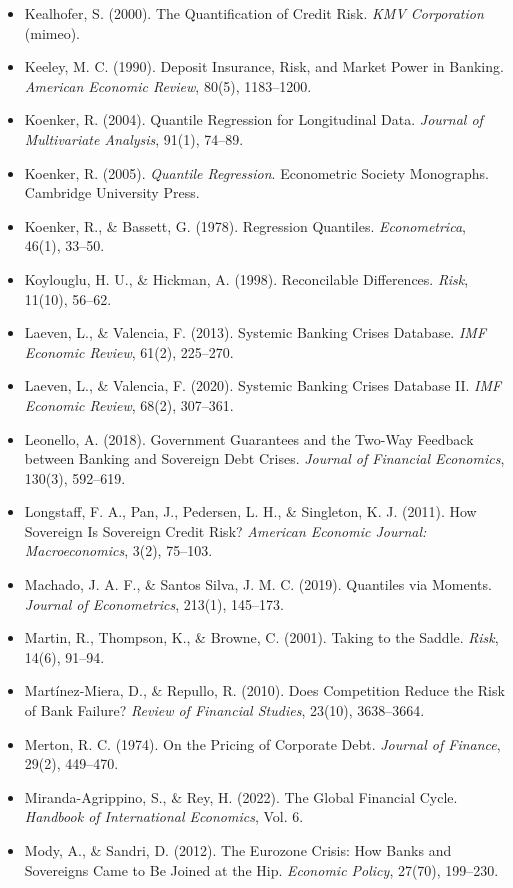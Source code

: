 \documentclass[5p,times,twocolumn,authoryear]{elsarticle}
\begin{document}
\begin{itemize}
    \item Kealhofer, S. (2000). The Quantification of Credit Risk. \textit{KMV Corporation} (mimeo).
    \item Keeley, M. C. (1990). Deposit Insurance, Risk, and Market Power in Banking. \textit{American Economic Review}, 80(5), 1183–1200.
    \item Koenker, R. (2004). Quantile Regression for Longitudinal Data. \textit{Journal of Multivariate Analysis}, 91(1), 74–89.
    \item Koenker, R. (2005). \textit{Quantile Regression}. Econometric Society Monographs. Cambridge University Press.
    \item Koenker, R., \& Bassett, G. (1978). Regression Quantiles. \textit{Econometrica}, 46(1), 33–50.
    \item Koylouglu, H. U., \& Hickman, A. (1998). Reconcilable Differences. \textit{Risk}, 11(10), 56–62.
    \item Laeven, L., \& Valencia, F. (2013). Systemic Banking Crises Database. \textit{IMF Economic Review}, 61(2), 225–270.
    \item Laeven, L., \& Valencia, F. (2020). Systemic Banking Crises Database II. \textit{IMF Economic Review}, 68(2), 307–361.
    \item Leonello, A. (2018). Government Guarantees and the Two-Way Feedback between Banking and Sovereign Debt Crises. \textit{Journal of Financial Economics}, 130(3), 592–619.
    \item Longstaff, F. A., Pan, J., Pedersen, L. H., \& Singleton, K. J. (2011). How Sovereign Is Sovereign Credit Risk? \textit{American Economic Journal: Macroeconomics}, 3(2), 75–103.
    \item Machado, J. A. F., \& Santos Silva, J. M. C. (2019). Quantiles via Moments. \textit{Journal of Econometrics}, 213(1), 145–173.
    \item Martin, R., Thompson, K., \& Browne, C. (2001). Taking to the Saddle. \textit{Risk}, 14(6), 91–94.
    \item Martínez-Miera, D., \& Repullo, R. (2010). Does Competition Reduce the Risk of Bank Failure? \textit{Review of Financial Studies}, 23(10), 3638–3664.
    \item Merton, R. C. (1974). On the Pricing of Corporate Debt. \textit{Journal of Finance}, 29(2), 449–470.
    \item Miranda-Agrippino, S., \& Rey, H. (2022). The Global Financial Cycle. \textit{Handbook of International Economics}, Vol. 6.
    \item Mody, A., \& Sandri, D. (2012). The Eurozone Crisis: How Banks and Sovereigns Came to Be Joined at the Hip. \textit{Economic Policy}, 27(70), 199–230.

\end{itemize}
\end{document}
